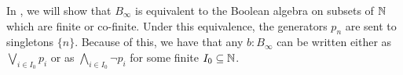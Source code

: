 \begin{remark}\label{BinftyTermsWriting}
  In , we will show that $B_\infty$ is equivalent to the Boolean algebra on 
  subsets of $\mathbb{N}$ which are finite or co-finite. 
  Under this equivalence, the generators $p_n$ are sent to singletons $\{n\}$. 
  Because of this, we have that any $b:B_\infty$ can be written 
  either as $\bigvee_{i\in I_0} p_i$ or as $\bigwedge_{i\in I_0} \neg p_i$ for some finite $I_0\subseteq \mathbb{N}$. 
\end{remark}





